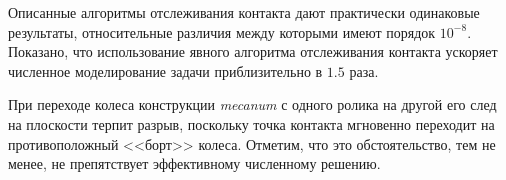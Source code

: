 %

Описанные алгоритмы отслеживания контакта дают практически одинаковые результаты, относительные различия между которыми имеют порядок $10^{-8}$. Показано, что использование явного алгоритма отслеживания контакта ускоряет численное моделирование задачи приблизительно в $1.5$ раза.

При переходе колеса конструкции \textit{mecanum} с одного ролика на другой его след на плоскости терпит разрыв, поскольку точка контакта мгновенно переходит на противоположный <<борт>> колеса. Отметим, что это обстоятельство, тем не менее, не препятствует эффективному численному решению.

%

